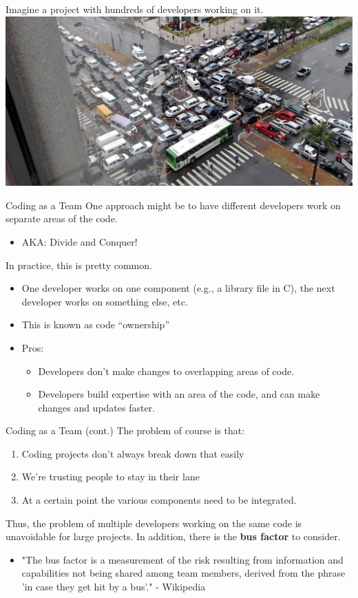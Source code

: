 \documentclass[11pt]{beamer}
\begin{document}
\begin{frame}
\center
Imagine a project with hundreds of developers working on it.
\includegraphics[scale=0.3]{gridlock.png} \\
\end{frame}

\begin{frame}{Coding as a Team}
One approach might be to have different developers work on separate areas of the code.
\begin{itemize}
\item AKA: Divide and Conquer!
\end{itemize}
In practice, this is pretty common.
\begin{itemize}
\item One developer works on one component (e.g., a library file in C), the next developer works on something else, etc.
\item This is known as code ``ownership''
\item Pros:
\begin{itemize}
\item Developers don't make changes to overlapping areas of code. 
\item Developers build expertise with an area of the code, and can make changes and updates faster.
\end{itemize}
\end{itemize}
\end{frame}

\begin{frame}{Coding as a Team (cont.)}
The problem of course is that:
\begin{enumerate}
\item Coding projects don't always break down that easily
\item We're trusting people to stay in their lane
\item At a certain point the various components need to be integrated.
\end{enumerate}
Thus, the problem of multiple developers working on the same code is unavoidable for large projects.  In addition, there is the \textbf{bus factor} to consider.
\begin{itemize}
\item "The bus factor is a measurement of the risk resulting
from information and capabilities not being shared
among team members, derived from the phrase 'in
case they get hit by a bus'." - Wikipedia
\end{itemize}
\end{frame}
\end{document}
